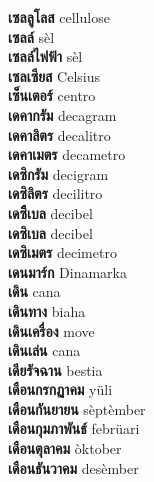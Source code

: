 \textbf{ เซลลูโลส  } cellulose \\
\textbf{ เซลล์  } sèl \\
\textbf{ เซลล์ไฟฟ้า  } sèl \\
\textbf{ เซลเซียส  } Celsius \\
\textbf{ เซ็นเตอร์  } centro \\
\textbf{ เดคากรัม  } decagram \\
\textbf{ เดคาลิตร  } decalitro \\
\textbf{ เดคาเมตร  } decametro \\
\textbf{ เดซิกรัม  } decigram \\
\textbf{ เดซิลิตร  } decilitro \\
\textbf{ เดซิืเบล  } decibel \\
\textbf{ เดซิเบล  } decibel \\
\textbf{ เดซิเมตร  } decimetro \\
\textbf{ เดนมาร์ก  } Dinamarka \\
\textbf{ เดิน  } cana \\
\textbf{ เดินทาง  } biaha \\
\textbf{ เดินเครื่อง  } move \\
\textbf{ เดินเล่น  } cana \\
\textbf{ เดียรัจฉาน  } bestia \\
\textbf{ เดือนกรกฏาคม  } yüli \\
\textbf{ เดือนกันยายน  } sèptèmber \\
\textbf{ เดือนกุมภาพันธ์  } febrüari \\
\textbf{ เดือนตุลาคม  } òktober \\
\textbf{ เดือนธันวาคม  } desèmber \\
